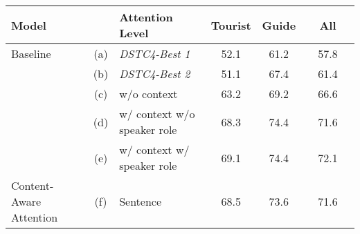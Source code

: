 \documentclass{article}
\begin{document}
\begin{table*}
\centering
  \begin{tabular}{ | l c l | c | c | c | }
    \hline
     \bf Model & & \bf Attention Level & \bf Tourist & \bf Guide & \bf ~~All~~ \\ \hline\hline
    Baseline & (a) & \emph{DSTC4-Best 1} & 52.1 & 61.2 & 57.8 \\
    & (b) & \emph{DSTC4-Best 2} & 51.1 & 67.4 & 61.4 \\
    & (c) & w/o context & 63.2 & 69.2 & 66.6 \\
    & (d) & w/ context w/o speaker role & 68.3 & 74.4 & 71.6 \\
    & (e) & w/ context w/ speaker role & 69.1 & 74.4 & 72.1\\\hline
    Content-Aware Attention & (f) & Sentence & 68.5 & 73.6 & 71.6\\

\end{tabular}
\end{table*}
\end{document}
